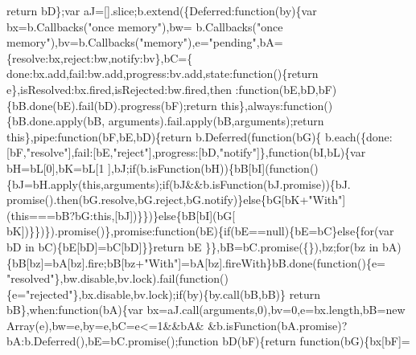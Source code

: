 \begin{DoxyCode}
{      return} bD\};var aJ=[].slice;b.extend(\{Deferred:\textcolor{keyword}{function}(by)\{var bx=b.Callbacks(\textcolor{stringliteral}{"once memory"}),bw=
      b.Callbacks(\textcolor{stringliteral}{"once memory"}),bv=b.Callbacks(\textcolor{stringliteral}{"memory"}),e=\textcolor{stringliteral}{"pending"},bA=\{resolve:bx,reject:bw,notify:bv\},bC=\{
      done:bx.add,fail:bw.add,progress:bv.add,state:\textcolor{keyword}{function}()\{\textcolor{keywordflow}{return} e\},isResolved:bx.fired,isRejected:bw.fired,then
      :\textcolor{keyword}{function}(bE,bD,bF)\{bB.done(bE).fail(bD).progress(bF);\textcolor{keywordflow}{return} \textcolor{keyword}{this}\},always:\textcolor{keyword}{function}()\{bB.done.apply(bB,
      arguments).fail.apply(bB,arguments);\textcolor{keywordflow}{return} \textcolor{keyword}{this}\},pipe:\textcolor{keyword}{function}(bF,bE,bD)\{\textcolor{keywordflow}{return} b.Deferred(\textcolor{keyword}{function}(bG)\{
      b.each(\{done:[bF,\textcolor{stringliteral}{"resolve"}],fail:[bE,\textcolor{stringliteral}{"reject"}],progress:[bD,\textcolor{stringliteral}{"notify"}]\},\textcolor{keyword}{function}(bI,bL)\{var bH=bL[0],bK=bL[1
      ],bJ;\textcolor{keywordflow}{if}(b.isFunction(bH))\{bB[bI](\textcolor{keyword}{function}()\{bJ=bH.apply(\textcolor{keyword}{this},arguments);\textcolor{keywordflow}{if}(bJ&&b.isFunction(bJ.promise))\{bJ.
      promise().then(bG.resolve,bG.reject,bG.notify)\}\textcolor{keywordflow}{else}\{bG[bK+\textcolor{stringliteral}{"With"}](\textcolor{keyword}{this}===bB?bG:\textcolor{keyword}{this},[bJ])\}\})\}\textcolor{keywordflow}{else}\{bB[bI](bG[
      bK])\}\})\}).promise()\},promise:\textcolor{keyword}{function}(bE)\{\textcolor{keywordflow}{if}(bE==null)\{bE=bC\}\textcolor{keywordflow}{else}\{\textcolor{keywordflow}{for}(var bD in bC)\{bE[bD]=bC[bD]\}\}\textcolor{keywordflow}{return} bE
      \}\},bB=bC.promise(\{\}),bz;\textcolor{keywordflow}{for}(bz in bA)\{bB[bz]=bA[bz].fire;bB[bz+\textcolor{stringliteral}{"With"}]=bA[bz].fireWith\}bB.done(\textcolor{keyword}{function}()\{e=\textcolor{stringliteral}{
      "resolved"}\},bw.disable,bv.lock).fail(\textcolor{keyword}{function}()\{e=\textcolor{stringliteral}{"rejected"}\},bx.disable,bv.lock);\textcolor{keywordflow}{if}(by)\{by.call(bB,bB)\}\textcolor{keywordflow}{
      return} bB\},when:\textcolor{keyword}{function}(bA)\{var bx=aJ.call(arguments,0),bv=0,e=bx.length,bB=\textcolor{keyword}{new} Array(e),bw=e,by=e,bC=e<=1&&bA&
      &b.isFunction(bA.promise)?bA:b.Deferred(),bE=bC.promise();\textcolor{keyword}{function} bD(bF)\{\textcolor{keywordflow}{return} \textcolor{keyword}{function}(bG)\{bx[bF]=

\end{DoxyCode}
